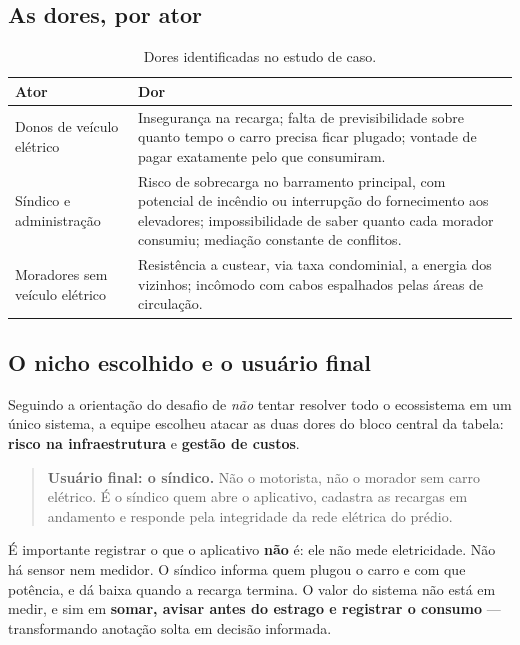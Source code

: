 \documentclass[12pt,a4paper]{article}
\begin{document}
\subsection{As dores, por ator}

\begin{table}[H]
\centering
\small
\begin{tabular}{@{}p{3.2cm}p{10.5cm}@{}}
\toprule
\textbf{Ator} & \textbf{Dor} \\
\midrule
Donos de veículo elétrico &
Insegurança na recarga; falta de previsibilidade sobre quanto tempo o carro precisa ficar
plugado; vontade de pagar exatamente pelo que consumiram. \\
\addlinespace
Síndico e administração &
Risco de sobrecarga no barramento principal, com potencial de incêndio ou interrupção do
fornecimento aos elevadores; impossibilidade de saber quanto cada morador consumiu;
mediação constante de conflitos. \\
\addlinespace
Moradores sem veículo elétrico &
Resistência a custear, via taxa condominial, a energia dos vizinhos; incômodo com cabos
espalhados pelas áreas de circulação. \\
\bottomrule
\end{tabular}
\caption{Dores identificadas no estudo de caso.}
\end{table}

\subsection{O nicho escolhido e o usuário final}

Seguindo a orientação do desafio de \textit{não} tentar resolver todo o ecossistema em um
único sistema, a equipe escolheu atacar as duas dores do bloco central da tabela:
\textbf{risco na infraestrutura} e \textbf{gestão de custos}.

\begin{quote}
\textbf{Usuário final: o síndico.} Não o motorista, não o morador sem carro elétrico. É o
síndico quem abre o aplicativo, cadastra as recargas em andamento e responde pela
integridade da rede elétrica do prédio.
\end{quote}

É importante registrar o que o aplicativo \textbf{não} é: ele não mede eletricidade. Não
há sensor nem medidor. O síndico informa quem plugou o carro e com que potência, e dá
baixa quando a recarga termina. O valor do sistema não está em medir, e sim em
\textbf{somar, avisar antes do estrago e registrar o consumo} --- transformando anotação
solta em decisão informada.
\end{document}
